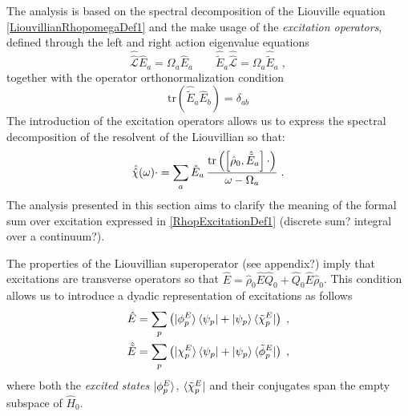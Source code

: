 \documentclass[reprint,aps,prb]{revtex4-1}
\newcommand{\be}{\begin{equation}}
\newcommand{\ee}{\end{equation}}
\newcommand{\nn}{\notag}
\newcommand{\qq}{\qquad}
\newcommand{\lb}{\label}
\newcommand{\op}[1]{\hat {#1}}
\newcommand{\sop}[1]{\op{\op {#1}}}
\newcommand{\commutator}[2]{\left[ {#1} , {#2} \right]}
\newcommand{\trace}[1]{\mathrm{tr}\left(#1\right)}
\newcommand{\dmnot}{\op{\rho}_0}
\newcommand{\hnot}{\op{H}_0}
\newcommand{\Liouv}{\sop{\mathcal L}}
\begin{document}
The analysis is based on the spectral decomposition of the Liouville equation \eqref{LiouvillianRhopomegaDef1} and the make usage of the \emph{excitation operators}, defined through the 
left and right action eigenvalue equations 
\be\lb{ExcitationOperatorsDef1}
\Liouv \op E_a = \Omega_a \op E_a \qq \op{\tilde E}_a \Liouv = \Omega_a \op{\tilde E}_a \;,
\ee
together with the operator orthonormalization condition %
\be\lb{orthoExcitatioOpDef1}
\trace{\op{\tilde E}_a\op E_b} = \delta_{ab}
\ee
The introduction of the excitation operators allows us to express the spectral decomposition of the resolvent of the Liouvillian so that:
\be\lb{RhopExcitationDef1}
\sop{{\cal \chi}}(\omega) \cdot   = \sum_a \op E_{a} \,
\frac{\trace{\commutator{\dmnot}{\op{\tilde E}_a}\cdot}}{\omega-\Omega_a} \;.
\ee 
The analysis presented in this section aims to clarify the meaning of the formal sum over excitation expressed in \eqref{RhopExcitationDef1} (discrete sum? integral over a continuum?).   

The properties of the Liouvillian superoperator (see appendix?) imply that excitations are transverse 
operators so that $\op E = \dmnot\op E\op Q_0 + \op Q_0\op E\dmnot$. This condition allows us to introduce a dyadic representation of excitations as follows
\begin{align}\lb{ExcitationOperatorsDef2}
\op E &= \sum_p \left( \ket{\phi^E_p}\bra{\psi_p} + \ket{\psi_p} \bra{\tilde\chi^E_p}\right)\;, \nn \\
\op{\tilde E} &= \sum_p \left( \ket{\chi^E_p}\bra{\psi_p} + \ket{\psi_p} \bra{\tilde\phi^E_p}\right)\;,
\end{align}
where both the \emph{excited states} $\ket{\phi^E_p}$, $\bra{\tilde\chi^E_p}$ and their conjugates span the empty subspace of $\hnot$. 
\end{document}

